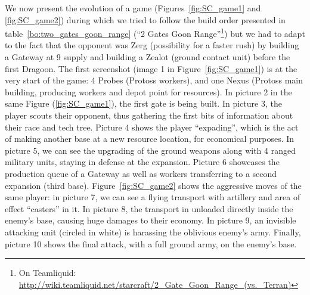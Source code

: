 
We now present the evolution of a game (Figures~\ref{fig:SC_game1} and \ref{fig:SC_game2}) during which we tried to follow the build order presented in table~\ref{bo:two_gates_goon_range} (``2 Gates Goon Range''\footnote{On Teamliquid: \url{http://wiki.teamliquid.net/starcraft/2_Gate_Goon_Range_(vs._Terran)}}) but we had to adapt to the fact that the opponent was Zerg (possibility for a faster rush) by building a Gateway at 9 supply and building a Zealot (ground contact unit) before the first Dragoon. The first screenshot (image 1 in Figure~\ref{fig:SC_game1}) is at the very start of the game: 4 Probes (Protoss workers), and one Nexus (Protoss main building, producing workers and depot point for resources). In picture 2 in the same Figure (\ref{fig:SC_game1}), the first gate is being built. In picture 3, the player scouts their opponent, thus gathering the first bits of information about their race and tech tree. Picture 4 shows the player ``expading'', which is the act of making another base at a new resource location, for economical purposes. In picture 5, we can see the upgrading of the ground weapons along with 4 ranged military units, staying in defense at the expansion. Picture 6 showcases the production queue of a Gateway as well as workers transferring to a second expansion (third base). Figure~\ref{fig:SC_game2} shows the aggressive moves of the same player: in picture 7, we can see a flying transport with artillery and area of effect ``casters'' in it. In picture 8, the transport in unloaded directly inside the enemy's base, causing huge damages to their economy. In picture 9, an invisible attacking unit (circled in white) is harassing the oblivious enemy's army. Finally, picture 10 shows the final attack, with a full ground army, on the enemy's base.

